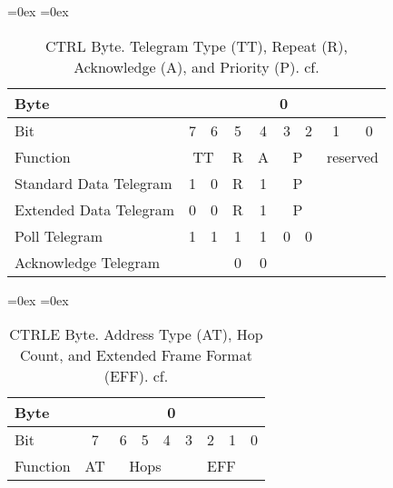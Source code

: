 		\begin{table}
			\aboverulesep=0ex
			\belowrulesep=0ex
			\renewcommand{\arraystretch}{1.2}
			
			\centering
			\begin{tabular}{|l|c|c|c|c|c|c|c|c|}
				\toprule
				Byte & \multicolumn{8}{c|}{0} \\\midrule
				Bit & 7 & 6 & 5 & 4 & 3 & 2 & 1 & 0 \\\midrule
				Function & \multicolumn{2}{c|}{TT} & R & A & \multicolumn{2}{c|}{P} & \multicolumn{2}{c|}{reserved} \\\bottomrule \toprule
				Standard Data Telegram & 1 & 0 & R & 1 & \multicolumn{2}{c|}{P} & \multicolumn{2}{c|}{ } \\\midrule
				Extended Data Telegram & 0 & 0 & R & 1 & \multicolumn{2}{c|}{P} & \multicolumn{2}{c|}{ } \\\midrule
				Poll Telegram & 1 & 1 & 1 & 1 & 0 & 0 & \multicolumn{2}{c|}{ } \\\midrule
				Acknowledge Telegram & \multicolumn{2}{c|}{ } & 0 &0 & \multicolumn{2}{c|}{ } & \multicolumn{2}{c|}{ } \\\bottomrule
			\end{tabular}
			\caption[\knx CTRL Byte]{\knx CTRL Byte. Telegram Type (TT), Repeat (R), Acknowledge (A), and Priority (P). cf. \textcite{Sokollik2017}}
			\label{tab:background:bas:knx:proto:ctrl}
		\end{table}
	
		\begin{table}
			\aboverulesep=0ex
			\belowrulesep=0ex
			\renewcommand{\arraystretch}{1.2}
			
			\centering
			\begin{tabular}{|l|c|c|c|c|c|c|c|c|}
				\toprule
				Byte & \multicolumn{8}{c|}{0} \\\midrule
				Bit & 7 & 6 & 5 & 4 & 3 & 2 & 1 & 0 \\\midrule
				Function & AT & \multicolumn{3}{c|}{Hops} & \multicolumn{4}{c|}{EFF} \\\bottomrule
			\end{tabular}
			\caption[\knx CTRLE Byte]{\knx CTRLE Byte. Address Type (AT), Hop Count, and Extended Frame Format (EFF). cf. \textcite{Sokollik2017}}
			\label{tab:background:bas:knx:proto:ctrle}
		\end{table}
	
